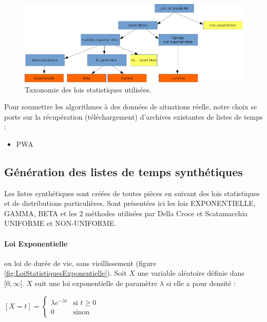 \documentclass[a4paper,12pt]{report}
\theoremstyle{plain}				%
\theoremstyle{definition}				%
\newcommand\dcs{Della Croce et Scatamacchia\xspace}
\newcommand{\lp}[1]{\todo[author=LP,color=yellow,inline]{#1}}
\begin{document}
\begin{figure}
{\centering
\includegraphics[width=\columnwidth]{taxonomieLoisStatistiques.png}
\caption{Taxonomie des lois statistiques utilisées.}
\label{fig:taxonomieLoisStatistiques}
\par}
\end{figure}

Pour soumettre les algorithmes à des données de situations réelle,
notre choix se porte sur la récupération (téléchargement) d'archives
existantes de listes de temps :
\lp{Dire ce que c'est}
\begin{itemize}
	\item PWA
\end{itemize}


\subsection{Génération des listes de temps synthétiques}\label{ssec:instancesGenerationListesTempsSynthetiques}
Les listes synthétiques sont créées de toutes pièces en suivant des lois statistiques et de distributions particulières. Sont présentées ici les lois EXPONENTIELLE, GAMMA, BETA et les 2 méthodes utilisées par \dcs UNIFORME et NON-UNIFORME.

\bigskip
\paragraph{Loi Exponentielle} 
ou loi de durée de vie, sans vieillissement (figure \ref{fig:LoiStatistiquesExponentielle}).
Soit $X$ une variable aléatoire définie dans $[0, \infty[$. $X$ suit une loi exponentielle de paramètre $\lambda$ si elle a pour densité :


  \begin{center}
  $[X=t] = \left\{
    \begin{array}{ll}
        \lambda e^{-\lambda t}  & \mbox{si } t \geq 0  \\
        0 & \mbox{sinon}
    \end{array}
	\right.$
  \label{definitionLoiExponentielleDensite}
  \end{center}
\end{document}
